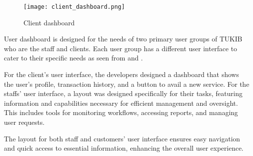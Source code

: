 \begin{figure}[h]
	\centering 
	\texttt{[image: client\_dashboard.png]}
	\caption{Client dashboard}
	\label{fig:client_dashboard}
\end{figure}

User dashboard is designed for the needs of two primary user groups of TUKIB who are the staff and clients. Each user group has a different user interface to cater to their specific needs as seen from  and . 

For the client’s user interface, the developers designed a dashboard that shows the user’s profile, transaction history, and a button to avail a new service. For the staffs’ user interface, a layout was designed specifically for their tasks, featuring information and capabilities necessary for efficient management and oversight. This includes tools for monitoring workflows, accessing reports, and managing user requests.

The layout for both staff and customers’ user interface ensures easy navigation and quick access to essential information, enhancing the overall user experience.

